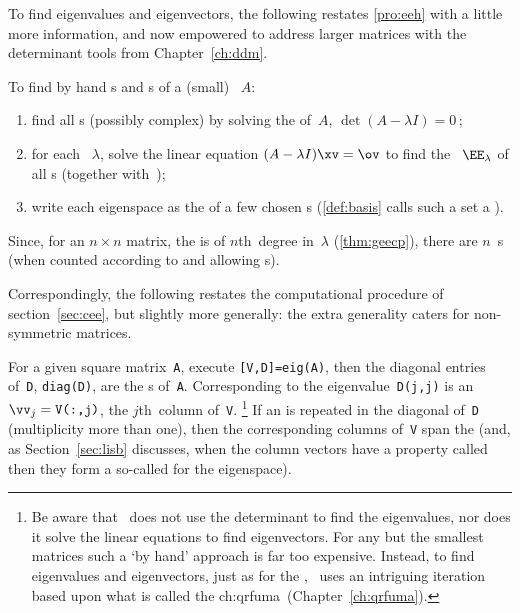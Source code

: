 To find eigenvalues and eigenvectors, the following restates \autoref{pro:eeh} with a little more information, and now empowered to address larger matrices with the determinant tools from Chapter~\ref{ch:ddm}.

\begin{procedure} \label{pro:geneig}
To find by hand s and s of a (small) ~\(A\):
\begin{enumerate}
\item find all s (possibly complex) by solving the  of~\(A\), \(\det(A-\lambda I)=0\)\,;
\item for each ~\(\lambda\), solve the  linear equation \((A-\lambda I)\xv=\ov\) to find the ~\(\EE_\lambda\) of all s (together with~\ov);
\item write each eigenspace as the  of a few chosen s  (\autoref{def:basis} calls such a set a ).
\end{enumerate}
Since, for an \(n\times n\) matrix, the  is of \(n\)th~degree in~\(\lambda\) (\autoref{thm:geecp}), there are \(n\)~s (when counted according to  and allowing s).
\end{procedure}

Correspondingly, the following restates the computational procedure of section~\ref{sec:cee}, but slightly more generally: the extra generality caters for non-symmetric matrices.

\begin{compute}
For a given square matrix~\verb|A|, execute \verb|[V,D]=eig(A)|, then the diagonal entries of~\verb|D|, \verb|diag(D)|, are the s of~\verb|A|. 
Corresponding to the eigenvalue~\verb|D(j,j)| is an   \(\vv_j=\verb|V(:,j)|\), the \(j\)th~column of~\verb|V|.  
\footnote{Be aware that \script\ does not use the determinant to find the eigenvalues, nor does it solve the linear equations to find eigenvectors.  
For any but the smallest matrices such a `by hand' approach is far too expensive.  
Instead, to find eigenvalues and eigenvectors, just as for the \svd, \script\ uses an intriguing iteration based upon what is called the \ifcsname ch:qrfuma\endcsname\ (Chapter~\ref{ch:qrfuma})\fi.}
If an  is repeated in the diagonal of~\verb|D| (multiplicity more than one), then the corresponding columns of~\verb|V| span the  
(and, as Section~\ref{sec:lisb} discusses, when the column vectors have a property called  then they form a so-called  for the eigenspace). 
\end{compute}




